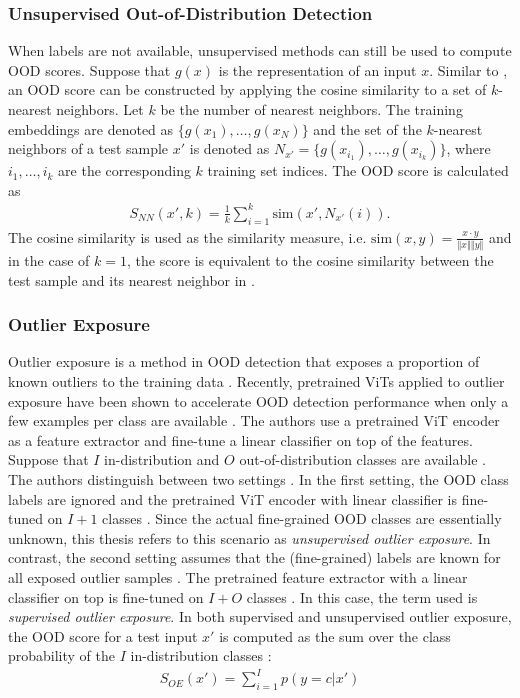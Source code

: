 \subsubsection{Unsupervised Out-of-Distribution Detection}
\label{section: Unsupervised Out-of-Distribution Detection}
When labels are not available, unsupervised methods can still be used to compute OOD scores.
Suppose that $g(x)$ is the representation of an input $x$.
Similar to \citep{Michels2023,Sun2022}, an OOD score can be constructed by applying the cosine similarity to a set of $k$-nearest neighbors.
Let $k$ be the number of nearest neighbors.
The training embeddings are denoted as $\{g(x_1),\dots,g(x_N)\}$ and the set of the $k$-nearest neighbors of a test sample $x'$ is denoted as $N_{x'} = \{g(x_{i_1}),\dots,g(x_{i_k})\}$, where $i_1,\dots,i_k$ are the corresponding $k$ training set indices.
The OOD score is calculated as \citep{Michels2023,Sun2022}
\begin{align}
	S_{NN}(x',k) = \frac{1}{k}\sum_{i=1}^k \text{sim}(x',N_{x'}(i)).
	\label{equation:knn-score}
\end{align}
The cosine similarity is used as the similarity measure, i.e. $\text{sim}(x,y) = \frac{x\cdot y}{\Vert x \Vert \Vert y \Vert}$ and in the case of $k=1$, the score is equivalent to the cosine similarity between the test sample and its nearest neighbor in \citep{Michels2023}.
\subsubsection{Outlier Exposure}
\label{section: Outlier Exposure}
Outlier exposure is a method in OOD detection that exposes a proportion of known outliers to the training data \citep{Hendrycks2018}.
Recently, pretrained ViTs applied to outlier exposure have been shown to accelerate OOD detection performance when only a few examples per class are available \citep{Fort2021}.
The authors use a pretrained ViT encoder as a feature extractor and fine-tune a linear classifier on top of the features.
Suppose that $I$ in-distribution and $O$ out-of-distribution classes are available \citep{Fort2021}.
The authors distinguish between two settings \citep{Fort2021}.
In the first setting, the OOD class labels are ignored and the pretrained ViT encoder with linear classifier is fine-tuned on $I+1$ classes \citep{Fort2021,Thulasidasan2021}.
Since the actual fine-grained OOD classes are essentially unknown, this thesis refers to this scenario as \textit{unsupervised outlier exposure}.
In contrast, the second setting assumes that the (fine-grained) labels are known for all exposed outlier samples \citep{Fort2021,Roy2021}.
The pretrained feature extractor with a linear classifier on top is fine-tuned on $I+O$ classes \citep{Fort2021}.
In this case, the term used is \textit{supervised outlier exposure}.
In both supervised and unsupervised outlier exposure, the OOD score for a test input $x'$ is computed as the sum over the class probability of the $I$ in-distribution classes \citep{Fort2021}:
\begin{align}
	S_{OE}(x') = \sum_{i=1}^{I}p(y=c|x') 
\end{align}
